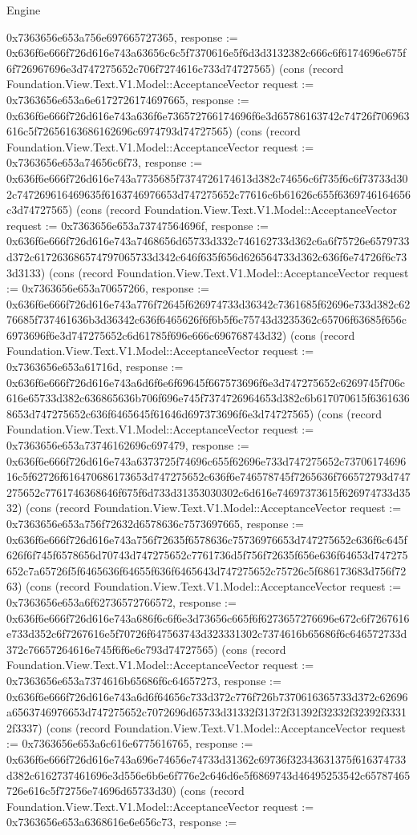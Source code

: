 \begin{lexlean}{Engine}
\begin{semanticmodule}
{0x7363656e653a756e697665727365, response := 0x636f6e666f726d616e743a63656c6c5f7370616e5f6d3d3132382c666c6f6174696e675f6f726967696e3d747275652c706f7274616c733d74727565}) (cons (record Foundation.View.Text.V1.Model::AcceptanceVector {request := 0x7363656e653a6e6172726174697665, response := 0x636f6e666f726d616e743a636f6e736572766174696f6e3d65786163742c74726f706963616c5f72656163686162696c6974793d74727565}) (cons (record Foundation.View.Text.V1.Model::AcceptanceVector {request := 0x7363656e653a74656c6f73, response := 0x636f6e666f726d616e743a7735685f7374726174613d382c74656c6f735f6c6f73733d302c747269616469635f6163746976653d747275652c77616c6b61626c655f6369746164656c3d74727565}) (cons (record Foundation.View.Text.V1.Model::AcceptanceVector {request := 0x7363656e653a73747564696f, response := 0x636f6e666f726d616e743a7468656d65733d332c746162733d362c6a6f75726e6579733d372c617263686574797065733d342c646f635f656d626564733d362c636f6e74726f6c733d3133}) (cons (record Foundation.View.Text.V1.Model::AcceptanceVector {request := 0x7363656e653a70657266, response := 0x636f6e666f726d616e743a776f72645f626974733d36342c7361685f62696e733d382c6276685f737461636b3d36342c636f6465626f6f6b5f6c75743d3235362c65706f63685f656c6973696f6e3d747275652c6d61785f696e666c696768743d32}) (cons (record Foundation.View.Text.V1.Model::AcceptanceVector {request := 0x7363656e653a61716d, response := 0x636f6e666f726d616e743a6d6f6e6f69645f667573696f6e3d747275652c6269745f706c616e65733d382c636865636b706f696e745f7374726964653d382c6b617070615f63616368653d747275652c636f6465645f61646d697373696f6e3d74727565}) (cons (record Foundation.View.Text.V1.Model::AcceptanceVector {request := 0x7363656e653a73746162696c697479, response := 0x636f6e666f726d616e743a6373725f74696c655f62696e733d747275652c7370617469616c5f62726f616470686173653d747275652c636f6e746578745f7265636f766572793d747275652c7761746368646f675f6d733d31353030302c6d616e74697373615f626974733d3532}) (cons (record Foundation.View.Text.V1.Model::AcceptanceVector {request := 0x7363656e653a756f72632d6578636c7573697665, response := 0x636f6e666f726d616e743a756f72635f6578636c75736976653d747275652c636f6c645f626f6f745f6578656d70743d747275652c7761736d5f756f72635f656e636f64653d747275652c7a65726f5f6465636f64655f636f6465643d747275652c75726c5f686173683d756f7263}) (cons (record Foundation.View.Text.V1.Model::AcceptanceVector {request := 0x7363656e653a6f62736572766572, response := 0x636f6e666f726d616e743a686f6c6f6e3d73656c665f6f6273657276696e672c6f7267616e733d352c6f7267616e5f70726f647563743d323331302c7374616b65686f6c646572733d372c76657264616e745f6f6e6c793d74727565}) (cons (record Foundation.View.Text.V1.Model::AcceptanceVector {request := 0x7363656e653a7374616b65686f6c64657273, response := 0x636f6e666f726d616e743a6d6f64656c733d372c776f726b7370616365733d372c62696a6563746976653d747275652c7072696d65733d31332f31372f31392f32332f32392f33312f3337}) (cons (record Foundation.View.Text.V1.Model::AcceptanceVector {request := 0x7363656e653a6c616e6775616765, response := 0x636f6e666f726d616e743a696e74656e74733d31362c69736f32343631375f616374733d382c6162737461696e3d556e6b6e6f776e2c646d6e5f6869743d46495253542c65787465726e616c5f72756e74696d65733d30}) (cons (record Foundation.View.Text.V1.Model::AcceptanceVector {request := 0x7363656e653a6368616e6e656c73, response := }
\end{semanticmodule}
\end{lexlean}
